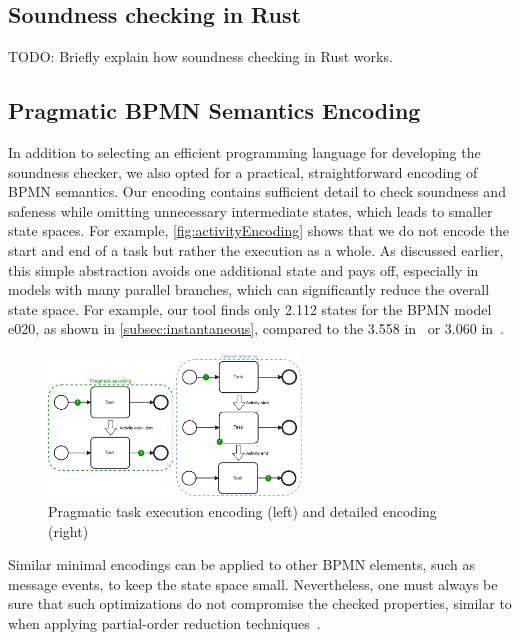 \documentclass[runningheads]{llncs}
\begin{document}
\subsection{Soundness checking in Rust}
TODO: Briefly explain how soundness checking in Rust works.

\subsection{Pragmatic BPMN Semantics Encoding}
In addition to selecting an efficient programming language for developing the soundness checker, we also opted for a practical, straightforward encoding of BPMN semantics.
Our encoding contains sufficient detail to check soundness and safeness while omitting unnecessary intermediate states, which leads to smaller state spaces.
For example, \autoref{fig:activityEncoding} shows that we do not encode the start and end of a task but rather the execution as a whole.
As discussed earlier, this simple abstraction avoids one additional state and pays off, especially in models with many parallel branches, which can significantly reduce the overall state space.
For example, our tool finds only 2.112 states for the BPMN model \textsf{e020}, as shown in \autoref{subsec:instantaneous}, compared to the 3.558 in~\cite{houhouFirstOrderLogicVerification2022} or 3.060 in~\cite{krauterFormalizationAnalysisBPMN2023}.

\begin{figure}[ht]
	\centering
	\includegraphics[width=0.6\textwidth]{images/pragmatic-encoding}
	\caption{Pragmatic task execution encoding (left) and detailed encoding (right)}
	\label{fig:activityEncoding}
\end{figure}

Similar minimal encodings can be applied to other BPMN elements, such as message events, to keep the state space small.
Nevertheless, one must always be sure that such optimizations do not compromise the checked properties, similar to when applying partial-order reduction techniques~\cite{valmariStateExplosionProblem1998}.
\end{document}
